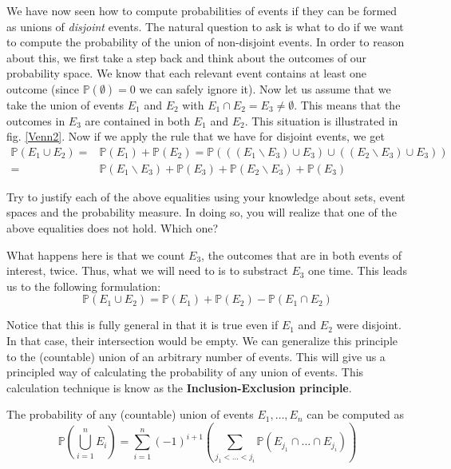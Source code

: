 \documentclass[a4paper,11pt,leqno]{report}
\begin{document}
We have now seen how to compute probabilities of events if they can be formed as unions of \textit{disjoint}
events. The natural question to ask is what to do if we want to compute the probability of the union
of non-disjoint events. In order to reason about this, we first take a step back and think about the
outcomes of our probability space. We know that each relevant event contains at least one outcome (since
$ \mathbb{P}(\emptyset) = 0 $ we can safely ignore it). Now let us assume that we take the union of events
$ E_{1} $ and $ E_{2} $ with $ E_{1} \cap E_{2} = E_{3} \not = \emptyset $. This means that the outcomes
in $ E_{3} $ are contained in both $ E_{1} $ and $ E_{2} $. This situation is illustrated in fig. 
\ref{Venn2}. Now if we apply the rule that we have for disjoint events, we get 
\begin{align} \label{InExFalse}
\mathbb{P}(E_{1} \cup E_{2}) =& \mathbb{P}(E_{1}) + \mathbb{P}(E_{2})
= \mathbb{P}(((E_{1}\backslash E_{3}) \cup E_{3}) \cup ((E_{2}\backslash E_{3}) \cup E_{3})) \\
=& \mathbb{P}(E_{1}\backslash E_{3}) + \mathbb{P}(E_{3}) + \mathbb{P}(E_{2}\backslash E_{3}) \nonumber
+ \mathbb{P}(E_{3})
\end{align}

\begin{Exercise}
Try to justify each of the above equalities using your knowledge about sets, event spaces and the 
probability measure. In doing so, you will realize that one of the above equalities does not hold.
Which one? 
\end{Exercise}

What happens here is that we count $ E_{3} $, the outcomes that are in both events of interest, twice.
Thus, what we will need to is to substract $ E_{3} $ one time. This leads us to the following formulation:
\begin{equation}
\mathbb{P}(E_{1} \cup E_{2}) = \mathbb{P}(E_{1}) + \mathbb{P}(E_{2}) - \mathbb{P}(E_{1} \cap E_{2})
\end{equation}

Notice that this is fully general in that it is true even if $ E_{1} $ and $ E_{2} $ were disjoint. In that
case, their intersection would be empty. We can generalize this principle to the (countable) union of
an arbitrary number of events. This will give us a principled way of calculating the probability of any
union of events. This calculation technique is know as the \textbf{Inclusion-Exclusion principle}.

\begin{Theorem}
The probability of any (countable) union of events $ E_{1}, \ldots, E_{n} $ can be computed as \\
$$ \mathbb{P} \left( \underset{i=1}{\overset{n}{\bigcup}} E_{i} \right) 
= \underset{i=1}{\overset{n}{\sum}} (-1)^{i+1} \left( \underset{j_{1}<\ldots<j_{i}}{\sum} 
\mathbb{P} \left(E_{j_{1}} \cap \ldots \cap E_{j_{i}} \right) \right)  $$
\end{Theorem}
\end{document}
